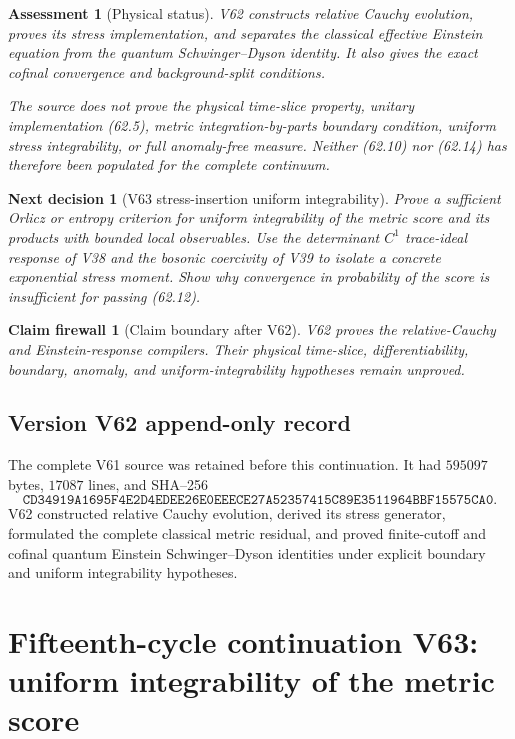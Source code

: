 \documentclass[11pt]{article}
\newtheorem{firewall}[theorem]{Claim firewall}
\newtheorem{decision}[theorem]{Next decision}
\newtheorem{assessment}[theorem]{Assessment}
\theoremstyle{remark}
\begin{document}
\begin{assessment}[Physical status]
\label{ass:v15v62-status}
V62 constructs relative Cauchy evolution, proves its stress
implementation, and separates the classical effective Einstein
equation from the quantum Schwinger--Dyson identity.  It also gives
the exact cofinal convergence and background-split conditions.

The source does not prove the physical time-slice property, unitary
implementation (62.5), metric integration-by-parts boundary
condition, uniform stress integrability, or full anomaly-free
measure.  Neither (62.10) nor (62.14) has therefore been populated
for the complete continuum.
\end{assessment}

\begin{decision}[V63 stress-insertion uniform integrability]
\label{dec:v15v62-next}
Prove a sufficient Orlicz or entropy criterion for uniform
integrability of the metric score and its products with bounded
local observables.  Use the determinant \(C^1\) trace-ideal response
of V38 and the bosonic coercivity of V39 to isolate a concrete
exponential stress moment.  Show why convergence in probability of
the score is insufficient for passing (62.12).
\end{decision}

\begin{firewall}[Claim boundary after V62]
\label{fire:v15v62}
V62 proves the relative-Cauchy and Einstein-response compilers.
Their physical time-slice, differentiability, boundary, anomaly,
and uniform-integrability hypotheses remain unproved.
\end{firewall}

\section*{Version V62 append-only record}
The complete V61 source was retained before this continuation.  It
had \(595097\) bytes, \(17087\) lines, and SHA--256
\[
 \texttt{CD34919A1695F4E2D4EDEE26E0EEECE27A52357415C89E3511964BBF15575CA0}.
\]
V62 constructed relative Cauchy evolution, derived its stress
generator, formulated the complete classical metric residual, and
proved finite-cutoff and cofinal quantum Einstein
Schwinger--Dyson identities under explicit boundary and uniform
integrability hypotheses.

\chapter{Fifteenth-cycle continuation V63: uniform integrability of the metric score}
\label{sec:v15v63}
\end{document}
